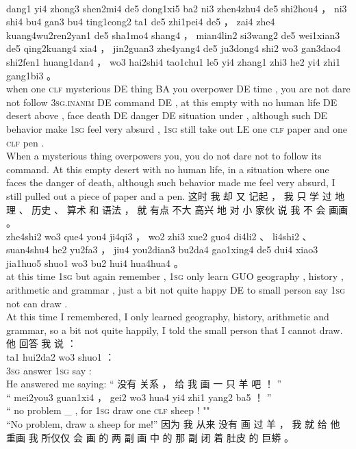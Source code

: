 \documentclass[UTF8]{ctexart}
\begin{document}
\begin{exe}
\\
dang1 yi4 zhong3 shen2mi4 de5 dong1xi5 ba2 ni3 zhen4zhu4 de5 shi2hou4 ， ni3 shi4 bu4 gan3 bu4 ting1cong2 ta1 de5 zhi1pei4 de5 ， zai4 zhe4 kuang4wu2ren2yan1 de5 sha1mo4 shang4 ， mian4lin2 si3wang2 de5 wei1xian3 de5 qing2kuang4 xia4 ， jin2guan3 zhe4yang4 de5 ju3dong4 shi2 wo3 gan3dao4 shi2fen1 huang1dan4 ， wo3 hai2shi4 tao1chu1 le5 yi4 zhang1 zhi3 he2 yi4 zhi1 gang1bi3 。
\\
when one \textsc{clf} mysterious DE thing BA you overpower DE time , you are not dare not {follow} \textsc{3sg.inanim} DE command DE , at this {empty with no human life} DE desert above , face death DE danger DE situation under , although such DE behavior make \textsc{1sg} feel very absurd , \textsc{1sg} still {take out} LE one \textsc{clf} paper and one \textsc{clf} pen .
\\
\trans When a mysterious thing overpowers you, you do not dare not to follow its command. At this empty desert with no human life, in a situation where one faces the danger of death, although such behavior made me feel very absurd, I still pulled out a piece of paper and a pen. 
\ex
\glll
这时 我 却 又 记起 ， 我 只 学 过 地理 、 历史 、 算术 和 语法 ， 就 有点 不大 高兴 地 对 小 家伙 说 我 不 会 画画 。
\\
zhe4shi2 wo3 que4 you4 ji4qi3 ， wo2 zhi3 xue2 guo4 di4li2 、 li4shi2 、 suan4shu4 he2 yu2fa3 ， jiu4 you2dian3 bu2da4 gao1xing4 de5 dui4 xiao3 jia1huo5 shuo1 wo3 bu2 hui4 hua4hua4 。
\\
{at this time} \textsc{1sg} but again remember , \textsc{1sg} only learn GUO geography , history , arithmetic and grammar , just {a bit} {not quite} happy DE to small person say \textsc{1sg} not can draw .
\\
\trans At this time I remembered, I only learned geography, history, arithmetic and grammar, so a bit not quite happily, I told the small person that I cannot draw.
\ex
\glll
他 回答 我 说 ：
\\
ta1 hui2da2 wo3 shuo1 ：
\\
\textsc{3sg} answer \textsc{1sg} say :
\\
\trans He answered me saying:
\ex
\glll
“ 没有 关系 ， 给 我 画 一 只 羊 吧 ！ ”
\\
“ mei2you3 guan1xi4 ， gei2 wo3 hua4 yi4 zhi1 yang2 ba5 ！ ”
\\
`` {no problem} {\_} , for \textsc{1sg} draw one \textsc{clf} sheep {} ! ""
\\
\trans ``No problem, draw a sheep for me!''
\ex
\glll
因为 我 从来 没有 画 过 羊 ， 我 就 给 他 重画 我 所仅仅 会 画 的 两 副 画 中 的 那 副 闭 着 肚皮 的 巨蟒 。

\end{exe}
\end{document}
